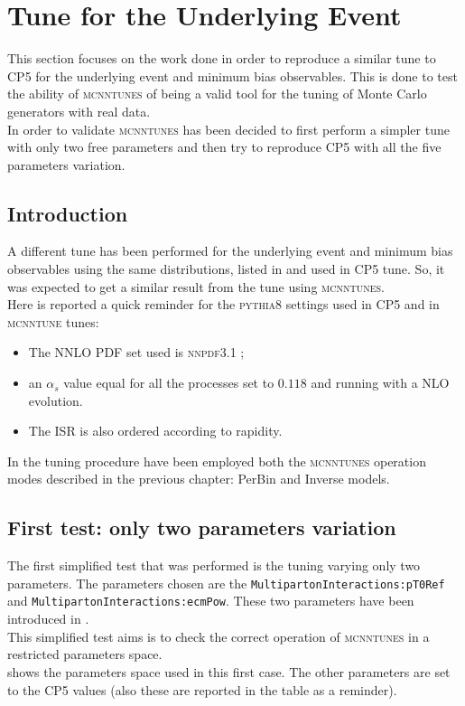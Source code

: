 \chapter{Tune for the Underlying Event}
\label{chap:OurTunefortheUnderlyingEvent}

This section focuses on the work done in order to reproduce a similar tune to CP5 for the underlying event and minimum bias observables. This is done to test the ability of \textsc{mcnntunes} of being a valid tool for the tuning of Monte Carlo generators with real data. 
\\
In order to validate \textsc{mcnntunes} has been decided to first perform a simpler tune with only two free parameters and then try to reproduce CP5 \cite{CPtunes} with all the five parameters variation.


\section{Introduction}

A different tune has been performed for the underlying event and minimum bias observables using the same distributions, listed in  and used in CP5 tune. So, it was expected to get a similar result from the tune using \textsc{mcnntunes}.
\\
Here is reported a quick reminder for the \textsc{pythia8} settings used in CP5 and in \textsc{mcnntune} tunes:
\begin{itemize}
	\item The NNLO PDF set used is \textsc{nnpdf}3.1 \cite{NNPDF:2017mvq}; 
	\item an $\alpha_s$ value equal for all the processes set to $0.118$ and running with a NLO evolution.
	\item The ISR is also ordered according to rapidity.
\end{itemize}
In the tuning procedure have been employed both the \textsc{mcnntunes} operation modes described in the previous chapter: PerBin and Inverse models.

\section{First test: only two parameters variation}

The first simplified test that was performed is the tuning varying only two parameters. The parameters chosen are the \texttt{Multiparton}\-\texttt{Interactions:}\-\texttt{pT0Ref} and 
\texttt{Multiparton}\-\texttt{Interactions:}\-\texttt{ecmPow}. These two parameters have been introduced in .
\\
This simplified test aims is to check the correct operation of \textsc{mcnntunes}  in a restricted parameters space.%
\\
 shows the parameters space used in this first case. The other parameters are set to the CP5 values (also these are reported in the table as a reminder).

